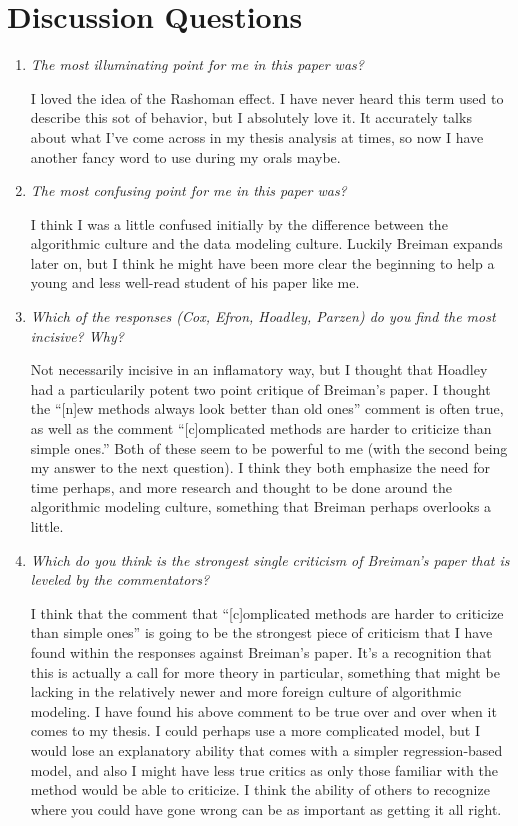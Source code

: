 \documentclass[10pt]{article}
\begin{document}
\section{Discussion Questions}

    \begin{enumerate}
    
        \item \textit{The most illuminating point for me in this paper was?}
        
        I loved the idea of the Rashoman effect. I have never heard this term used to describe this sot of behavior, but I absolutely love it. It accurately talks about what I've come across in my thesis analysis at times, so now I have another fancy word to use during my orals maybe.
        
    	\item \textit{The most confusing point for me in this paper was?}
	
		I think I was a little confused initially by the difference between the algorithmic culture and the data modeling culture. Luckily Breiman expands later on, but I think he might have been more clear the beginning to help a young and less well-read student of his paper like me.
	
    	\item \textit{Which of the responses (Cox, Efron, Hoadley, Parzen) do you find the most incisive? Why?}
	
		Not necessarily incisive in an inflamatory way, but I thought that Hoadley had a particularily potent two point critique of Breiman's paper. I thought the ``[n]ew methods always look better than old ones'' comment is often true, as well as the comment ``[c]omplicated methods are harder to criticize than simple ones.'' Both of these seem to be powerful to me (with the second being my answer to the next question). I think they both emphasize the need for time perhaps, and more research and thought to be done around the algorithmic modeling culture, something that Breiman perhaps overlooks a little.
	
    	\item \textit{Which do you think is the strongest single criticism of Breiman's paper that is leveled by the commentators?}
	
		I think that the comment that ``[c]omplicated methods are harder to criticize than simple ones'' is going to be the strongest piece of criticism that I have found within the responses against Breiman's paper. It's a recognition that this is actually a call for more theory in particular, something that might be lacking in the relatively newer and more foreign culture of algorithmic modeling. I have found his above comment to be true over and over when it comes to my thesis. I could perhaps use a more complicated model, but I would lose an explanatory ability that comes with a simpler regression-based model, and also I might have less true critics as only those familiar with the method would be able to criticize. I think the ability of others to recognize where you could have gone wrong can be as important as getting it all right.
	

\end{enumerate}
\end{document}
